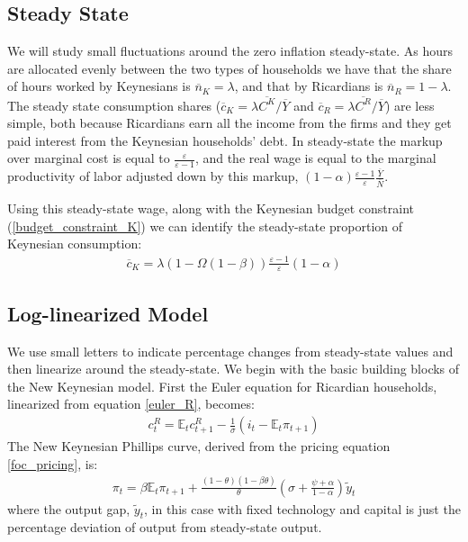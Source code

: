 \documentclass[titlepage]{\econtex}\newcommand{\texname}{ConsumptionHeterogeneity}
\begin{document}
\subsection{Steady State}
We will study small fluctuations around the zero inflation steady-state. As hours are allocated evenly between the two types of households we have that the share of hours worked by Keynesians is $\overline{n}_{K} = \lambda$, and that by Ricardians is $\overline{n}_{R} = 1-\lambda$. The steady state consumption shares ($\overline{c}_{K} = \lambda\overline{C^K}/\overline{Y}$ and $\overline{c}_{R} = \lambda\overline{C^R}/\overline{Y}$) are less simple, both because Ricardians earn all the income from the firms and they get paid interest from the Keynesian households' debt. In steady-state the markup over marginal cost is equal to $\frac{\varepsilon}{\varepsilon-1}$, and the real wage is equal to the marginal productivity of labor adjusted down by this markup, $(1-\alpha) \frac{\varepsilon-1}{\varepsilon}\frac{\overline{Y}}{\overline{N}}$. 

Using this steady-state wage, along with the Keynesian budget constraint (\ref{budget_constraint_K}) we can identify the steady-state proportion of Keynesian consumption:
\begin{align}
\overline{c}_{K} = \lambda \left(1-\Omega(1-\beta)\right)\frac{\varepsilon-1}{\varepsilon}(1-\alpha) \label{c_K_ss}
\end{align}

\subsection{Log-linearized Model}
We use small letters to indicate percentage changes from steady-state values and then linearize around the steady-state. We begin with the basic building blocks of the New Keynesian model. First the Euler equation for Ricardian households, linearized from equation \ref{euler_R}, becomes:
\begin{align}
c^R_t = \mathbb{E}_t c^R_{t+1} - \frac{1}{\sigma}(i_t - \mathbb{E}_t\pi_{t+1}) \label{euler_R_linear}
\end{align}
The New Keynesian Phillips curve, derived from the pricing equation \ref{foc_pricing}, is:
\begin{align}
\pi_t=\beta \mathbb{E}_t\pi_{t+1}+\frac{(1-\theta)(1-\beta\theta)}{\theta}\left(\sigma +  \frac{\psi + \alpha}{1-\alpha} \right)\tilde{y}_t \label{NKphillips_linear}
\end{align}
where the output gap, $\tilde{y}_t$, in this case with fixed technology and capital is just the percentage deviation of output from steady-state output.
\end{document}

